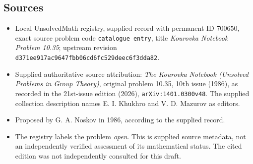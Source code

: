 \documentclass[11pt]{article}
\begin{document}
\subsection{Sources}
\begin{itemize}
\item Local UnsolvedMath registry, supplied record with permanent ID \(700650\), exact source problem code \texttt{catalogue entry}, title \emph{Kourovka Notebook Problem 10.35}; upstream revision \texttt{d371ee917ac9647fbb06cd6fc529deec6f3dda82}.
\item Supplied authoritative source attribution: \emph{The Kourovka Notebook (Unsolved Problems in Group Theory)}, original problem 10.35, 10th issue (1986), as recorded in the 21st-issue edition (2026), \texttt{arXiv:1401.0300v48}. The supplied collection description names E. I. Khukhro and V. D. Mazurov as editors.
\item Proposed by G. A. Noskov in 1986, according to the supplied record.
\item The registry labels the problem \emph{open}. This is supplied source metadata, not an independently verified assessment of its mathematical status. The cited edition was not independently consulted for this draft.
\end{itemize}
\end{document}
